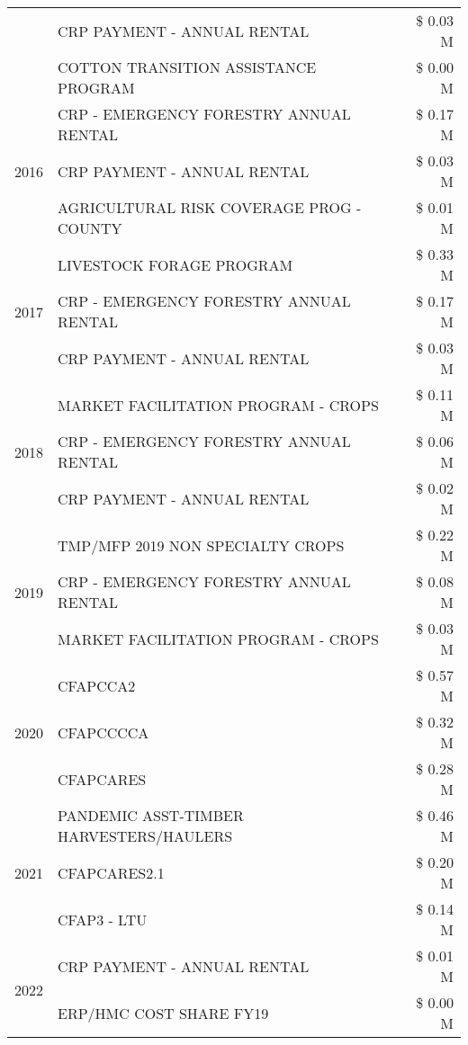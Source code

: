 \begin{tabular}{llr}
 & CRP PAYMENT - ANNUAL RENTAL & \$ 0.03 M \\
 & COTTON TRANSITION ASSISTANCE PROGRAM & \$ 0.00 M \\
\cline{1-3}
\multirow[t]{3}{*}{2016} & CRP - EMERGENCY FORESTRY ANNUAL RENTAL & \$ 0.17 M \\
 & CRP PAYMENT - ANNUAL RENTAL & \$ 0.03 M \\
 & AGRICULTURAL RISK COVERAGE PROG - COUNTY & \$ 0.01 M \\
\cline{1-3}
\multirow[t]{3}{*}{2017} & LIVESTOCK FORAGE PROGRAM & \$ 0.33 M \\
 & CRP - EMERGENCY FORESTRY ANNUAL RENTAL & \$ 0.17 M \\
 & CRP PAYMENT - ANNUAL RENTAL & \$ 0.03 M \\
\cline{1-3}
\multirow[t]{3}{*}{2018} & MARKET FACILITATION PROGRAM - CROPS & \$ 0.11 M \\
 & CRP - EMERGENCY FORESTRY ANNUAL RENTAL & \$ 0.06 M \\
 & CRP PAYMENT - ANNUAL RENTAL & \$ 0.02 M \\
\cline{1-3}
\multirow[t]{3}{*}{2019} & TMP/MFP 2019 NON SPECIALTY CROPS & \$ 0.22 M \\
 & CRP - EMERGENCY FORESTRY ANNUAL RENTAL & \$ 0.08 M \\
 & MARKET FACILITATION PROGRAM - CROPS & \$ 0.03 M \\
\cline{1-3}
\multirow[t]{3}{*}{2020} & CFAPCCA2 & \$ 0.57 M \\
 & CFAPCCCCA & \$ 0.32 M \\
 & CFAPCARES & \$ 0.28 M \\
\cline{1-3}
\multirow[t]{3}{*}{2021} & PANDEMIC ASST-TIMBER HARVESTERS/HAULERS & \$ 0.46 M \\
 & CFAPCARES2.1 & \$ 0.20 M \\
 & CFAP3 - LTU & \$ 0.14 M \\
\cline{1-3}
\multirow[t]{2}{*}{2022} & CRP PAYMENT - ANNUAL RENTAL & \$ 0.01 M \\
 & ERP/HMC COST SHARE FY19 & \$ 0.00 M \\
\cline{1-3}
\bottomrule
\end{tabular}
